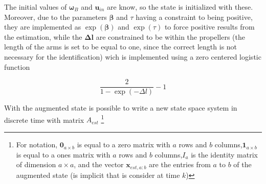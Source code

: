 \noindent The initial values of $\boldsymbol{\omega}_B$ and $\mathbf{u}_{in}$ are know, so the state is initialized with these. Moreover, due to the parameters $\boldsymbol{\beta}$ and $\tau$ having a constraint to being positive, they are implemented as $\exp(\boldsymbol{\beta})$ and $\exp(\tau)$ to force positive results from the estimation, while the $\boldsymbol{\Delta l}$ are constrained to be within the propellers (the length of the arms is set to be equal to one, since the correct length is not necessary for the identification) wich is implemented using a zero centered logistic function

\begin{equation}
	\frac{2}{1-\exp(-\Delta l)} -1
	\label{eq:logisticFunction}
\end{equation}

\noindent With the augmented state is possible to write a new state space system in discrete time with matrix $A_{est}$ \footnote{For notation, $\mathbf{0}_{a\times b}$ is equal to a zero matrix with $a$ rows and $b$ columns,$\mathbf{1}_{a\times b}$ is equal to a ones matrix with $a$ rows and $b$ columns,$I_a$ is the identity matrix of dimension $a\times a$, and the vector $\mathbf{x}_{est,a:b}$ are the entries from $a$ to $b$ of the augmented state (is implicit that is consider at time $k$)}


